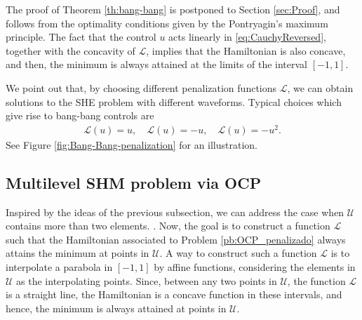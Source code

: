 \documentclass[twocolumn]{autart}    %
\begin{document}
The proof of Theorem \ref{th:bang-bang} is postponed to Section \ref{sec:Proof}, and follows from the optimality conditions given by the Pontryagin's maximum principle. The fact that the control $u$ acts linearly in \eqref{eq:CauchyReversed}, together with the concavity of $\mathcal{L}$, implies that the Hamiltonian is also concave, and then, the minimum is always attained at the limits of the interval $[-1,1]$.

We point out that, by choosing different penalization functions $\mathcal{L}$, we can obtain solutions to the SHE problem with different waveforms.
Typical choices which give rise to bang-bang controls are 
\begin{align*}
	\mathcal{L}(u) = u,  \quad \mathcal{L}(u) = -u,  \quad \mathcal{L}(u) = -u^2.
\end{align*} 
See Figure \ref{fig:Bang-Bang-penalization} for an illustration.

\subsection{Multilevel SHM problem via OCP}

Inspired by the ideas of the previous subsection, we can address the case when $\mathcal{U}$ contains more than two elements. . Now, the goal is to construct a function $\mathcal{L}$ such that the Hamiltonian associated to Problem \ref{pb:OCP_penalizado} always attains the minimum at points in $\mathcal{U}$.
A way to construct such a function $\mathcal{L}$ is to interpolate a parabola in $[-1,1]$ by affine functions, considering the elements in $\mathcal{U}$ as the interpolating points.  Since, between any two points in $\mathcal{U}$,  the function $\mathcal{L}$ is a straight line,  the Hamiltonian is a concave function in these intervals, and hence, the minimum is always attained at points in $\mathcal{U}$.
\end{document}
